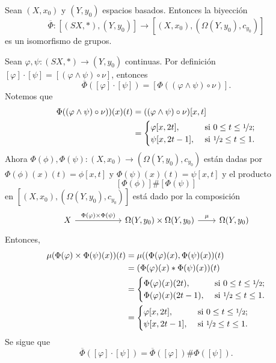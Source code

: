 \begin{prop}
\label{prop:over Phi isomorphism}
    Sean $(X,x_0)$ y $(Y,y_0)$ espacios basados. Entonces la biyección
    \begin{equation*}
        \overline{\Phi}:[(SX,*),(Y,y_0)]\to[(X,x_0),(\Omega(Y,y_0),c_{y_0})]
    \end{equation*}
    es un isomorfismo de grupos.
\end{prop}
\begin{dem}
    Sean $\varphi,\psi:(SX,*)\to(Y,y_0)$ continuas. Por definición $[\varphi]\cdot[\psi]=[(\varphi\wedge \psi)\circ\nu]$, entonces
    \begin{equation*}
        \overline{\Phi}([\varphi]\cdot[\psi])=[\Phi((\varphi\wedge \psi)\circ\nu)].
    \end{equation*}
    Notemos que
    \begin{align*}
        \Phi((\varphi\wedge \psi)\circ\nu))(x)(t)&=
        ((\varphi\wedge \psi)\circ\nu)[x,t]\\
        &=\begin{cases}
            \varphi[x,2t], &\text{ si } 0\leq t\leq \nicefrac{1}{2};\\
            \psi[x,2t-1], &\text{ si } \nicefrac{1}{2}\leq t \leq 1.
        \end{cases}
    \end{align*}
    Ahora $\Phi(\phi),\Phi(\psi):(X,x_0)\to (\Omega(Y,y_0),c_{y_0})$ están dadas por $\Phi(\phi)(x)(t)=\phi[x,t]$ y $\Phi(\psi)(x)(t)=\psi[x,t]$ y el producto $$[\Phi(\phi)]\#[\Phi(\psi)]$$ 
    en $[(X,x_0),(\Omega(Y,y_0),c_{y_0})]$ está dado por la composición 
     \begin{equation*}
        \begin{tikzcd}[column sep=0.75cm]
            X\arrow[r, "\Phi(\varphi)\times \Phi(\psi)"] &[1.2cm] \Omega(Y,y_0)\times\Omega(Y,y_0)\arrow[r, "\mu"] & \Omega(Y,y_0)
        \end{tikzcd}
    \end{equation*}
   Entonces, 
    \begin{align*}
        \mu(\Phi(\varphi)\times\Phi(\psi)(x))(t)&=\mu((\Phi(\varphi)(x),\Phi(\psi)(x))(t)\\
        &=(\Phi(\varphi)(x)*\Phi(\psi)(x))(t)\\
        &=\begin{cases}
            \Phi(\varphi)(x)(2t), &\text{ si } 0\leq t\leq \nicefrac{1}{2};\\
            \Phi(\varphi)(x)(2t-1), &\text{ si } \nicefrac{1}{2}\leq t \leq 1.
        \end{cases}\\
        &=\begin{cases}
            \varphi[x,2t], &\text{ si } 0\leq t\leq \nicefrac{1}{2};\\
            \psi[x,2t-1], &\text{ si } \nicefrac{1}{2}\leq t \leq 1.
        \end{cases}
    \end{align*}
    Se sigue que 
    \begin{equation*}
        \overline{\Phi}([\varphi]\cdot[\psi])=\overline{\Phi}([\varphi])\#\Phi([\psi]).
    \end{equation*}
\end{dem}
